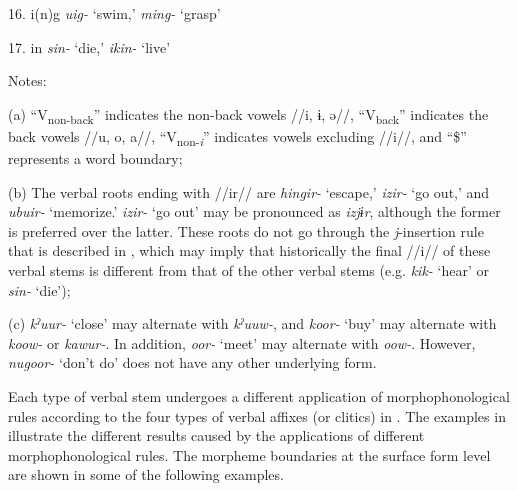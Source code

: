 \begin{table}
16.  i(n)g  \textit{uig-} ‘swim,’ \textit{ming-} ‘grasp’

17.  in  \textit{sin-} ‘die,’ \textit{ikin-} ‘live’

Notes:

(a) “V\textsubscript{non-back}” indicates the non-back vowels //i, ɨ, ə//, “V\textsubscript{back}” indicates the back vowels //u, o, a//, “V\textsubscript{non-}\textit{\textsubscript{i}}” indicates vowels excluding //i//, and “\$” represents a word boundary;

(b) The verbal roots ending with //ir// are \textit{hingir-} ‘escape,’ \textit{izir-} ‘go out,’ and \textit{ubuir-} ‘memorize.’ \textit{izir-} ‘go out’ may be pronounced as \textit{izjɨr}, although the former is preferred over the latter. These roots do not go through the \textit{j}{}-insertion rule that is described in , which may imply that historically the final //i// of these verbal stems is different from that of the other verbal stems (e.g. \textit{kik-} ‘hear’ or \textit{sin-} ‘die’);

(c) \textit{kˀuur-} ‘close’ may alternate with \textit{kˀuuw-}, and \textit{koor-} ‘buy’ may alternate with \textit{koow-} or \textit{kawur-}. In addition, \textit{oor-} ‘meet’ may alternate with \textit{oow-}. However, \textit{nugoor-} ‘don’t do’ does not have any other underlying form.
\end{table}

Each type of verbal stem undergoes a different application of morphophonological rules according to the four types of verbal affixes (or clitics) in . The examples in  illustrate the different results caused by the applications of different morphophonological rules. The morpheme boundaries at the surface form level are shown in some of the following examples.

